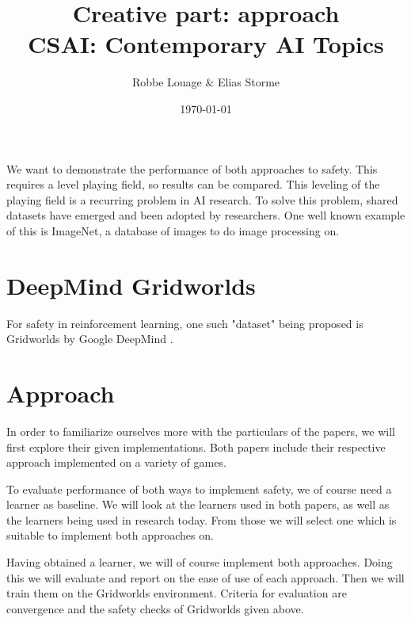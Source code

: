 \documentclass[a4paper,kul]{kulakarticle}
\begin{document}
\title{}
\title{Creative part: approach\\CSAI: Contemporary AI Topics}
\author{Robbe Louage \& Elias Storme}
\date{\today}
\maketitle
\vspace{1.5em}

We want to demonstrate the performance of both approaches to safety. This requires a level 
playing field, so results can be compared. This leveling of the playing field is a recurring 
problem in AI research. To solve this problem, shared datasets have emerged and been adopted by researchers. One well known example of this is ImageNet, a database of images to do image processing on.
\section{DeepMind Gridworlds}
For safety in reinforcement learning, one such "dataset" being proposed is Gridworlds by Google DeepMind \cite{leike2017ai}. 

\section{Approach}
In order to familiarize ourselves more with the particulars of the papers, we will first explore their given implementations. Both papers include their respective approach implemented on a variety of games.
\par To evaluate performance of both ways to implement safety, we of course need a learner as baseline. We will look at the learners used in both papers, as well as the learners being used in research today. From those we will select one which is suitable to implement both approaches on.
\par Having obtained a learner, we will of course implement both approaches. Doing this we will evaluate and report on the ease of use of each approach. Then we will train them on the Gridworlds environment. Criteria for evaluation are convergence and the safety checks of Gridworlds given above.



\end{document}
